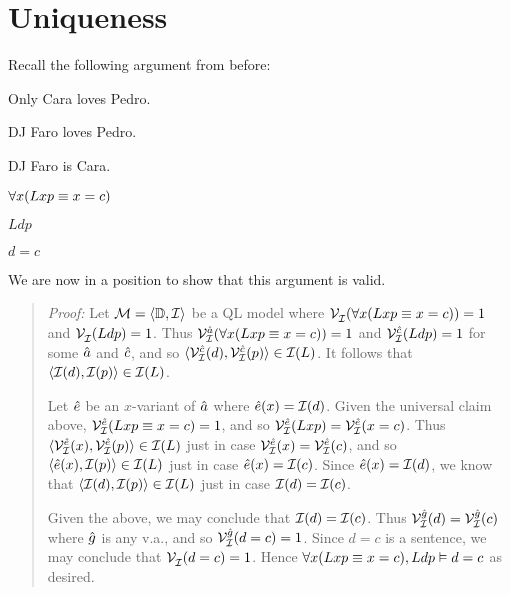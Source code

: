 \section{Uniqueness}

Recall the following argument from before:

\begin{multicols}{2}

\begin{earg}
  \item[] Only Cara loves Pedro.
  \item[] DJ Faro loves Pedro.
  \item[\therefore] DJ Faro is Cara.
\end{earg}

\begin{earg}
  \item[] $\forall x(Lxp \equiv x=c)$
  \item[] $Ldp$
  \item[\therefore] $d=c$
\end{earg}

\end{multicols}

We are now in a position to show that this argument is valid.

\begin{quote}
\label{unique1}
  \textit{Proof:}
  Let $\mathcal{M}=\langle\mathbb{D},\mathcal{I}\rangle$ be a QL model where $\mathcal{V}_{\mathcal{I}}^{}(\forall x(Lxp \equiv x=c))=1$ and $\mathcal{V}_{\mathcal{I}}^{}(Ldp)=1$.
  Thus $\mathcal{V}_{\mathcal{I}}^{\hat{a}}(\forall x(Lxp \equiv x=c))=1$ and $\mathcal{V}_{\mathcal{I}}^{\hat{c}}(Ldp)=1$ for some $\hat{a}$ and $\hat{c}$, and so $\langle\mathcal{V}_{\mathcal{I}}^{\hat{c}}(d),\mathcal{V}_{\mathcal{I}}^{\hat{c}}(p)\rangle\in\mathcal{I}(L)$.
  It follows that $\langle\mathcal{I}(d),\mathcal{I}(p)\rangle\in\mathcal{I}(L)$.

  Let $\hat{e}$ be an $x$-variant of $\hat{a}$ where $\hat{e}(x)=\mathcal{I}(d)$.
  Given the universal claim above, $\mathcal{V}_{\mathcal{I}}^{\hat{e}}(Lxp \equiv x=c)=1$, and so $\mathcal{V}_{\mathcal{I}}^{\hat{e}}(Lxp)=\mathcal{V}_{\mathcal{I}}^{\hat{e}}(x=c)$.
  Thus $\langle\mathcal{V}_{\mathcal{I}}^{\hat{e}}(x),\mathcal{V}_{\mathcal{I}}^{\hat{e}}(p)\rangle\in\mathcal{I}(L)$ just in case $\mathcal{V}_{\mathcal{I}}^{\hat{e}}(x)=\mathcal{V}_{\mathcal{I}}^{\hat{e}}(c)$, and so $\langle\hat{e}(x),\mathcal{I}(p)\rangle\in\mathcal{I}(L)$ just in case $\hat{e}(x)=\mathcal{I}(c)$.
  Since $\hat{e}(x)=\mathcal{I}(d)$, we know that $\langle\mathcal{I}(d),\mathcal{I}(p)\rangle\in\mathcal{I}(L)$ just in case $\mathcal{I}(d)=\mathcal{I}(c)$.

  Given the above, we may conclude that $\mathcal{I}(d)=\mathcal{I}(c)$.
  Thus $\mathcal{V}_{\mathcal{I}}^{\hat{g}}(d)=\mathcal{V}_{\mathcal{I}}^{\hat{g}}(c)$ where $\hat{g}$ is any v.a., and so $\mathcal{V}_{\mathcal{I}}^{\hat{g}}(d=c)=1$.
  Since $d=c$ is a sentence, we may conclude that $\mathcal{V}_{\mathcal{I}}^{}(d=c)=1$. 
  Hence $\forall x(Lxp \equiv x=c), Ldp \vDash d=c$ as desired. 
\end{quote}

